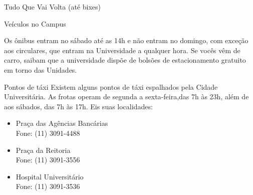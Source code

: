 \begin{secao}{Tudo Que Vai Volta (até bixes)}
\begin{subsecao}{Veículos no Campus}
\begin{itemize}
\end{itemize}

Os ônibus entram no sábado até as 14h e não entram no domingo, com exceção aos circulares, que entram na Universidade a qualquer hora. Se vocês vêm de carro, saibam que a universidade dispõe de bolsões de estacionamento
gratuito em torno das Unidades.

\end{subsecao}

\begin{subsecao}{Pontos de táxi}
Existem alguns pontos de táxi espalhados pela Cidade Universitária. As frotas 
operam de segunda a sexta-feira,das 7h às 23h, além de aos sábados, das 7h às 17h.
Eis suas localidades:

\begin{itemize}
\item Praça das Agências Bancárias\\
Fone: (11) 3091-4488

\item Praça da Reitoria\\
Fone: (11) 3091-3556

\item Hospital Universitário\\
Fone: (11) 3091-3536
\end{itemize}
\end{subsecao}

\end{secao}
